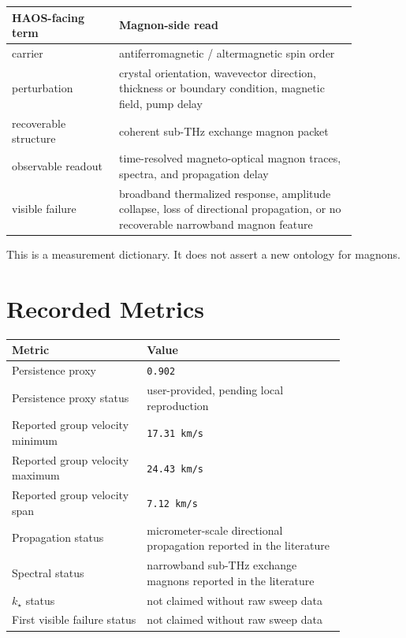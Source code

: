 \documentclass[11pt]{article}
\begin{document}
\begin{longtable}{p{0.27\linewidth}p{0.60\linewidth}}
\toprule
HAOS-facing term & Magnon-side read \\
\midrule
\endhead
carrier & antiferromagnetic / altermagnetic spin order \\
perturbation & crystal orientation, wavevector direction, thickness or boundary condition, magnetic field, pump delay \\
recoverable structure & coherent sub-THz exchange magnon packet \\
observable readout & time-resolved magneto-optical magnon traces, spectra, and propagation delay \\
visible failure & broadband thermalized response, amplitude collapse, loss of directional propagation, or no recoverable narrowband magnon feature \\
\bottomrule
\end{longtable}

This is a measurement dictionary. It does not assert a new ontology for magnons.

\section{Recorded Metrics}

\begin{center}
\begin{tabular}{p{0.34\linewidth}p{0.50\linewidth}}
\toprule
Metric & Value \\
\midrule
Persistence proxy & \texttt{0.902} \\
Persistence proxy status & user-provided, pending local reproduction \\
Reported group velocity minimum & \texttt{17.31 km/s} \\
Reported group velocity maximum & \texttt{24.43 km/s} \\
Reported group velocity span & \texttt{7.12 km/s} \\
Propagation status & micrometer-scale directional propagation reported in the literature \\
Spectral status & narrowband sub-THz exchange magnons reported in the literature \\
\(k_\star\) status & not claimed without raw sweep data \\
First visible failure status & not claimed without raw sweep data \\
\bottomrule
\end{tabular}
\end{center}
\end{document}
